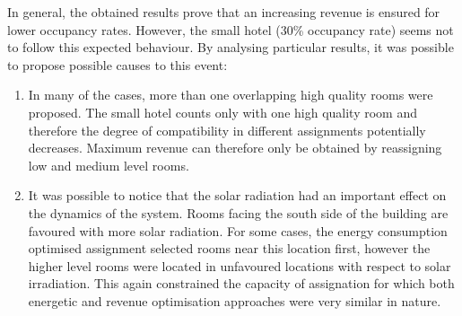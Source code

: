 \documentclass[letterpaper, 10 pt, conference]{ieeeconf}
\begin{document}
In general, the obtained results prove that an increasing revenue is ensured for lower occupancy rates. However, the small hotel (30\% occupancy rate) seems not to follow this expected behaviour. By analysing particular results, it was possible to propose possible causes to this event:
\begin{enumerate}
	\item In many of the cases, more than one overlapping high quality rooms were proposed. The small hotel counts only with one high quality room and therefore the degree of compatibility in different assignments potentially decreases. Maximum revenue can therefore only be obtained by reassigning low and medium level rooms.
	\item It was possible to notice that the solar radiation had an important effect on the dynamics of the system. Rooms facing the south side of the building are favoured with more solar radiation. For some cases, the energy consumption optimised assignment selected rooms near this location first, however the higher level rooms were located in unfavoured locations with respect to solar irradiation. This again constrained the capacity of assignation for which both energetic and revenue optimisation approaches were very similar in nature.
\end{enumerate}
\end{document}
